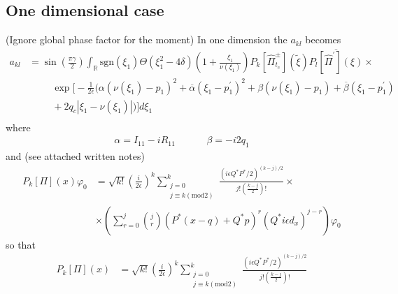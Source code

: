 \documentclass[12pt]{article}
\numberwithin{equation}{section}
\begin{document}
\begin{appendices}
\subsection{One dimensional case}
(Ignore global phase factor for the moment)
In one dimension the $a_{kl}$ becomes 
\begin{equation}
  \begin{split}
    a_{kl} &= 
    \sin\left(\frac{\pi \gamma}{2}\right)
    \int_{\mathbb{R}} \text{sgn}(\xi_1) \Theta(\xi_1^2 - 4\delta)
    \left( 1 + \frac{\xi_1}{\nu(\xi_1)} \right)
      P_k[\hat{\Pi}^{\pm}_{t_c}](\tilde{\xi})
      \overline{ P_l[\hat{\Pi}^\prime](\xi)} 
    \times 
    \\
    &
    \hspace{1cm}
    \exp \Bigg[-\frac{1}{2\epsilon} 
        \Big( \alpha (\nu(\xi_1) - p_1)^2 + \overline{\alpha} (\xi_1 - p_1^\prime)^2
          + \beta (\nu(\xi_1) - p_1) + \overline{\beta} (\xi_1 - p_1^\prime)
    \\
    &
    \hspace{1cm}
    + 2q_c|\xi_1 - \nu(\xi_1)|
      \Big) 
    \Bigg]  d \xi_1 
    \\
  \end{split}
\end{equation}
where 
\begin{equation}
  \begin{split}
  \alpha = I_{11} - i R_{11} &\hspace{1cm}  
    \beta = -i2q_1 
  \end{split}
\end{equation}
and (see attached written notes)
\begin{equation}
  \begin{split}
  P_{k}[\Pi](x) \varphi_0&= 
  \sqrt{k!} \left( \frac{i}{2\epsilon} \right)^k
  \sum_{\substack{j=0 \\ j \equiv k (\text{mod} 2)}}^k \frac{(i \epsilon Q^*P^*/2)^{(k-j)/2}}{j! (\frac{k-j}{2})!}
  \times
  \\
  &\times 
  \left(
    \sum_{r=0}^j \binom{j}{r} \left( P^*(x-q) + Q^*p  \right)^r
    \left( Q^*i\epsilon d_x  \right)^{j - r}
  \right)
  \varphi_0
  \end{split}
\end{equation}
so that 
\begin{equation}
  \begin{split}
  P_{k}[\Pi](x) &= 
  \sqrt{k!} \left( \frac{i}{2\epsilon} \right)^k
  \sum_{\substack{j=0 \\ j \equiv k (\text{mod} 2)}}^k \frac{(i \epsilon Q^*P^*/2)^{(k-j)/2}}{j! (\frac{k-j}{2})!}

\end{split}
\end{equation}
\end{appendices}
\end{document}
